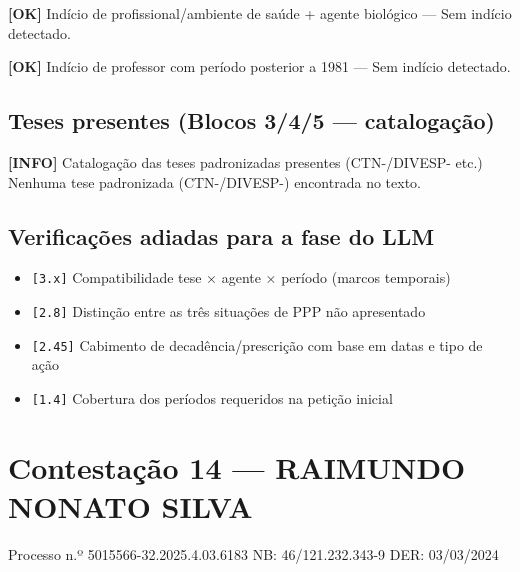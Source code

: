 \documentclass[12pt,a4paper]{article}
\newcommand{\statusOK}[1]{\textcolor{corOK}{\textbf{[OK]}} #1}
\newcommand{\statusINFO}[1]{\textcolor{corINFO}{\textbf{[INFO]}} #1}
\begin{document}
\medskip
\statusOK{Indício de profissional/ambiente de saúde + agente biológico} --- Sem indício detectado.

\medskip
\statusOK{Indício de professor com período posterior a 1981} --- Sem indício detectado.

\subsection{Teses presentes (Blocos 3/4/5 --- catalogação)}

\statusINFO{Catalogação das teses padronizadas presentes (CTN-/DIVESP- etc.)}\\
Nenhuma tese padronizada (CTN-/DIVESP-) encontrada no texto.

\subsection{Verificações adiadas para a fase do LLM}

\begin{itemize}
  \item \texttt{[3.x]} Compatibilidade tese × agente × período (marcos temporais)
  \item \texttt{[2.8]} Distinção entre as três situações de PPP não apresentado
  \item \texttt{[2.45]} Cabimento de decadência/prescrição com base em datas e tipo de ação
  \item \texttt{[1.4]} Cobertura dos períodos requeridos na petição inicial
\end{itemize}



\clearpage
{}
\section{Contestação 14 --- RAIMUNDO NONATO SILVA}
\begin{center}
  {\small Processo n.º 5015566-32.2025.4.03.6183 \quad NB: 46/121.232.343-9 \quad DER: 03/03/2024}
\end{center}
\end{document}
